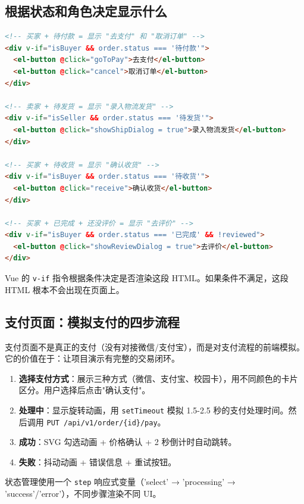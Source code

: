 \documentclass[12pt,a4paper]{ctexart}
\begin{document}
\subsection{根据状态和角色决定显示什么}

\begin{lstlisting}[language=HTML]
<!-- 买家 + 待付款 = 显示 "去支付" 和 "取消订单" -->
<div v-if="isBuyer && order.status === '待付款'">
  <el-button @click="goToPay">去支付</el-button>
  <el-button @click="cancel">取消订单</el-button>
</div>

<!-- 卖家 + 待发货 = 显示 "录入物流发货" -->
<div v-if="isSeller && order.status === '待发货'">
  <el-button @click="showShipDialog = true">录入物流发货</el-button>
</div>

<!-- 买家 + 待收货 = 显示 "确认收货" -->
<div v-if="isBuyer && order.status === '待收货'">
  <el-button @click="receive">确认收货</el-button>
</div>

<!-- 买家 + 已完成 + 还没评价 = 显示 "去评价" -->
<div v-if="isBuyer && order.status === '已完成' && !reviewed">
  <el-button @click="showReviewDialog = true">去评价</el-button>
</div>
\end{lstlisting}

Vue 的 \texttt{v-if} 指令根据条件决定是否渲染这段 HTML。如果条件不满足，这段 HTML 根本不会出现在页面上。

\subsection{支付页面：模拟支付的四步流程}

支付页面不是真正的支付（没有对接微信/支付宝），而是对支付流程的前端模拟。它的价值在于：让项目演示有完整的交易闭环。

\begin{enumerate}
  \item \textbf{选择支付方式}：展示三种方式（微信、支付宝、校园卡），用不同颜色的卡片区分。用户选择后点击"确认支付"。
  \item \textbf{处理中}：显示旋转动画，用 \texttt{setTimeout} 模拟 1.5-2.5 秒的支付处理时间。然后调用 \texttt{PUT /api/v1/order/\{id\}/pay}。
  \item \textbf{成功}：SVG 勾选动画 + 价格确认 + 2 秒倒计时自动跳转。
  \item \textbf{失败}：抖动动画 + 错误信息 + 重试按钮。
\end{enumerate}

状态管理使用一个 \texttt{step} 响应式变量（'select' → 'processing' → 'success'/'error'），不同步骤渲染不同 UI。
\end{document}
